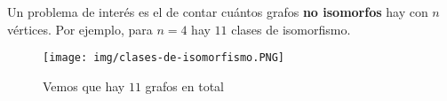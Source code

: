 Un problema de interés es el de contar cuántos grafos \textbf{no isomorfos} hay con $n$ vértices. Por ejemplo, para $n = 4$ hay $11$ clases de isomorfismo.

\begin{figure}
    \centering
    \texttt{[image: img/clases-de-isomorfismo.PNG]}
    \caption{Vemos que hay $11$ grafos en total}
\end{figure}